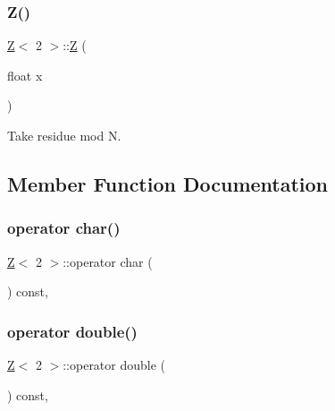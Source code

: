 \subsubsection{\texorpdfstring{Z()}{Z()}\hspace{0.1cm}{\footnotesize\ttfamily [5/5]}}
{\footnotesize\ttfamily \hyperlink{classZ}{Z}$<$ 2 $>$\+::\hyperlink{classZ}{Z} (\begin{DoxyParamCaption}\item[{float}]{x }\end{DoxyParamCaption})\hspace{0.3cm}{\ttfamily [inline]}}



Take residue mod N. 



\subsection{Member Function Documentation}
\mbox{\label{classZ_3_012_01_4_a3ecfc6d71107934335d39749dbf74b96}} 
\subsubsection{\texorpdfstring{operator char()}{operator char()}}
{\footnotesize\ttfamily \hyperlink{classZ}{Z}$<$ 2 $>$\+::operator char (\begin{DoxyParamCaption}{ }\end{DoxyParamCaption}) const\hspace{0.3cm}{\ttfamily [inline]}, {\ttfamily [explicit]}}

\mbox{\label{classZ_3_012_01_4_afc37211cc313fbcf3577916c70661283}} 
\subsubsection{\texorpdfstring{operator double()}{operator double()}}
{\footnotesize\ttfamily \hyperlink{classZ}{Z}$<$ 2 $>$\+::operator double (\begin{DoxyParamCaption}{ }\end{DoxyParamCaption}) const\hspace{0.3cm}{\ttfamily [inline]}, {\ttfamily [explicit]}}

